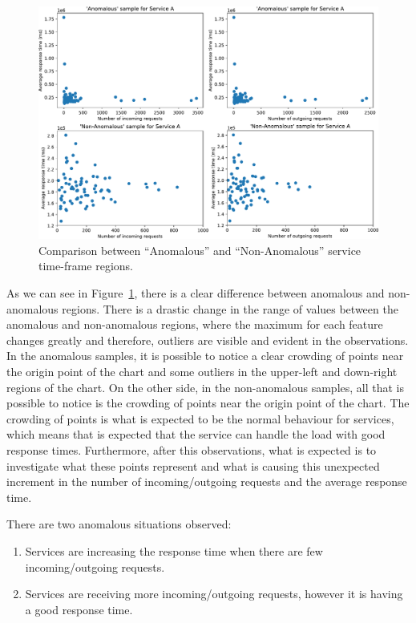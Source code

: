 \begin{figure}[H]
  \centering\includegraphics[width=1.0\linewidth]{images/result_samples_for_service_a_cc.pdf}
  \captionsetup{justification=centering}
  \caption{Comparison between ``Anomalous'' and ``Non-Anomalous'' service time-frame regions.}
  \label{fig:comparison_anomalous_non_anomalous_regions}
\end{figure}

As we can see in Figure~\ref{fig:comparison_anomalous_non_anomalous_regions}, there is a clear difference between anomalous and non-anomalous regions. There is a drastic change in the range of values between the anomalous and non-anomalous regions, where the maximum for each feature changes greatly and therefore, outliers are visible and evident in the observations. In the anomalous samples, it is possible to notice a clear crowding of points near the origin point of the chart and some outliers in the upper-left and down-right regions of the chart. On the other side, in the non-anomalous samples, all that is possible to notice is the crowding of points near the origin point of the chart. The crowding of points is what is expected to be the normal behaviour for services, which means that is expected that the service can handle the load with good response times. Furthermore, after this observations, what is expected is to investigate what these points represent and what is causing this unexpected increment in the number of incoming/outgoing requests and the average response time. 

There are two anomalous situations observed:

\begin{enumerate}
  \item Services are increasing the response time when there are few incoming/outgoing requests.
  \item Services are receiving more incoming/outgoing requests, however it is having a good response time.
\end{enumerate}

